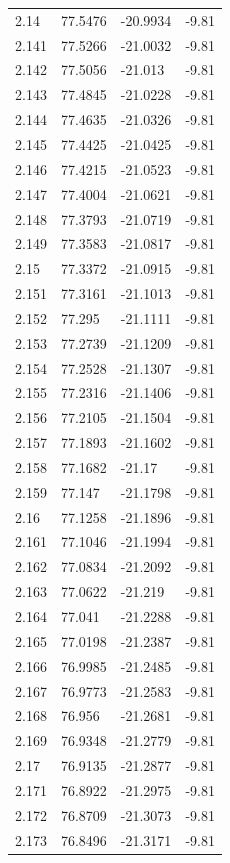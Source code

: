 \begin{tabular}{llll}
2.14 & 77.5476 & -20.9934 & -9.81 \\
2.141 & 77.5266 & -21.0032 & -9.81 \\
2.142 & 77.5056 & -21.013 & -9.81 \\
2.143 & 77.4845 & -21.0228 & -9.81 \\
2.144 & 77.4635 & -21.0326 & -9.81 \\
2.145 & 77.4425 & -21.0425 & -9.81 \\
2.146 & 77.4215 & -21.0523 & -9.81 \\
2.147 & 77.4004 & -21.0621 & -9.81 \\
2.148 & 77.3793 & -21.0719 & -9.81 \\
2.149 & 77.3583 & -21.0817 & -9.81 \\
2.15 & 77.3372 & -21.0915 & -9.81 \\
2.151 & 77.3161 & -21.1013 & -9.81 \\
2.152 & 77.295 & -21.1111 & -9.81 \\
2.153 & 77.2739 & -21.1209 & -9.81 \\
2.154 & 77.2528 & -21.1307 & -9.81 \\
2.155 & 77.2316 & -21.1406 & -9.81 \\
2.156 & 77.2105 & -21.1504 & -9.81 \\
2.157 & 77.1893 & -21.1602 & -9.81 \\
2.158 & 77.1682 & -21.17 & -9.81 \\
2.159 & 77.147 & -21.1798 & -9.81 \\
2.16 & 77.1258 & -21.1896 & -9.81 \\
2.161 & 77.1046 & -21.1994 & -9.81 \\
2.162 & 77.0834 & -21.2092 & -9.81 \\
2.163 & 77.0622 & -21.219 & -9.81 \\
2.164 & 77.041 & -21.2288 & -9.81 \\
2.165 & 77.0198 & -21.2387 & -9.81 \\
2.166 & 76.9985 & -21.2485 & -9.81 \\
2.167 & 76.9773 & -21.2583 & -9.81 \\
2.168 & 76.956 & -21.2681 & -9.81 \\
2.169 & 76.9348 & -21.2779 & -9.81 \\
2.17 & 76.9135 & -21.2877 & -9.81 \\
2.171 & 76.8922 & -21.2975 & -9.81 \\
2.172 & 76.8709 & -21.3073 & -9.81 \\
2.173 & 76.8496 & -21.3171 & -9.81 \\

\end{tabular}

